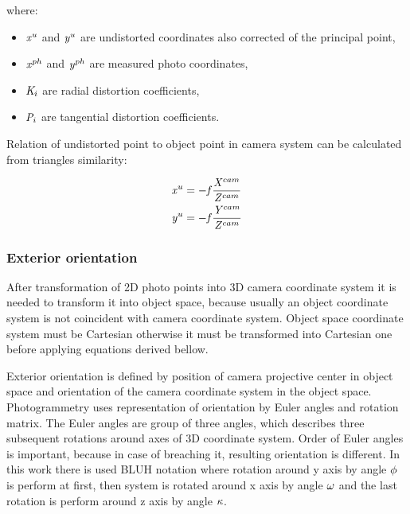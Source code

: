 \documentclass[a4paper,12pt]{article}
\newcommand{\escal}[1]{
{\it #1}
}
\begin{document}
where:


\begin{itemize}
  \item $\escal{x}^{u}$ and $\escal{y}^{u}$  are undistorted coordinates also corrected of the principal point,
  \item $\escal{x}^{ph}$ and $\escal{y}^{ph}$ are measured photo coordinates,
  \item $\escal{K}_{i}$ are radial distortion coefficients,
  \item $\escal{P}_{i}$ are tangential distortion coefficients.
\end{itemize}


Relation of undistorted point to object point in camera system can be calculated from 
triangles similarity:

\begin{equation}
\begin{split}
&\escal{x}^{u} =  - \escal{f} \frac{\escal{X}^{cam}}{\escal{Z}^{cam}}   \\
&\escal{y}^{u} = - \escal{f} \frac{\escal{Y}^{cam}}{\escal{Z}^{cam}} 
\end{split}
\end{equation}


\subsubsection{Exterior orientation}
\label{sec:eo}

After transformation of 2D photo points into 3D camera coordinate system it is needed to transform it into object space,
because usually an object coordinate system is not coincident with camera coordinate system. 
Object space coordinate system must be Cartesian otherwise it must be transformed into Cartesian one before applying equations 
derived bellow. 


Exterior orientation is defined by position of camera projective center in object space and orientation of the camera coordinate system in the object space.
Photogrammetry uses representation of orientation by Euler angles and rotation matrix.
The Euler angles are group of three angles, which describes three subsequent rotations
 around axes of 3D coordinate system. 
 Order of Euler angles is important, because in case of breaching it, resulting orientation is different. 
 In this work there is used BLUH notation \cite{baumker2001new} where rotation around y axis by angle $\escal{\phi}$ is 
 perform at first, then system is rotated around x axis  by angle $\escal{\omega}$ and
 the last rotation is perform around z axis by angle $\escal{\kappa}$.
 
\end{document}

